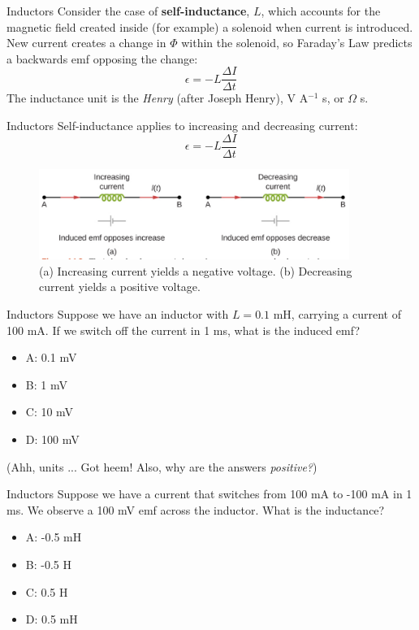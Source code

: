 \documentclass{beamer}
\begin{document}
\begin{frame}{Inductors}
Consider the case of \textbf{\alert{self-inductance}}, $L$, which accounts for the magnetic field created inside (for example) a solenoid when current is introduced.  New current creates a change in $\Phi$ within the solenoid, so Faraday's Law predicts a backwards emf opposing the change:
\begin{equation}
\boxed{
\epsilon = -L \frac{\Delta I}{\Delta t}}
\end{equation}
\footnotesize
The inductance unit is the \textit{Henry} (after Joseph Henry), V A$^{-1}$ s, or $\Omega$ s.
\end{frame}

\begin{frame}{Inductors}
Self-inductance applies to increasing and decreasing current:
\begin{equation}
\boxed{
\epsilon = -L \frac{\Delta I}{\Delta t}}
\end{equation}
\begin{figure}
\centering
\includegraphics[width=0.9\textwidth,trim=0cm 1.5cm 0cm 0cm,clip=true]{figures/ind4.png}
\caption{\label{fig:ind} (a) Increasing current yields a negative voltage. (b) Decreasing current yields a positive voltage.}
\end{figure}
\end{frame}

\begin{frame}{Inductors}
Suppose we have an inductor with $L = 0.1$ mH, carrying a current of 100 mA.  If we switch off the current in 1 ms, what is the induced emf?
\begin{itemize}
\item A: 0.1 mV
\item B: 1 mV
\item C: 10 mV
\item D: 100 mV
\end{itemize}
\footnotesize
(Ahh, units ... Got heem!  Also, why are the answers \textit{positive?})
\end{frame}

\begin{frame}{Inductors}
Suppose we have a current that switches from 100 mA to -100 mA in 1 ms.  We observe a 100 mV emf across the inductor.  What is the inductance?
\begin{itemize}
\item A: -0.5 mH
\item B: -0.5 H
\item C: 0.5 H 
\item D: 0.5 mH
\end{itemize}
\end{frame}
\end{document}

